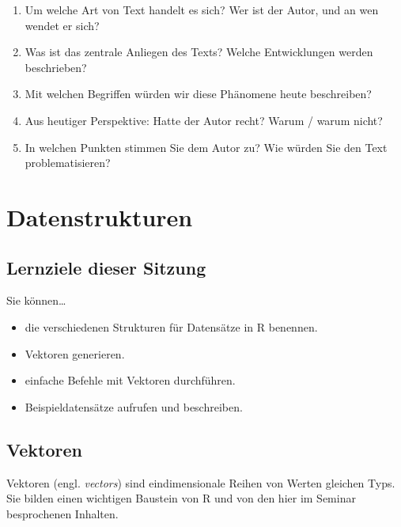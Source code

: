 \documentclass[11pt,german,a4paper]{article}
\providecommand{\tightlist}{%
  \setlength{\itemsep}{0pt}\setlength{\parskip}{0pt}}
\begin{document}
\begin{enumerate}
\def\labelenumi{\arabic{enumi}.}
\tightlist
\item
  Um welche Art von Text handelt es sich? Wer ist der Autor, und an wen wendet er sich?
\item
  Was ist das zentrale Anliegen des Texts? Welche Entwicklungen werden beschrieben?
\item
  Mit welchen Begriffen würden wir diese Phänomene heute beschreiben?
\item
  Aus heutiger Perspektive: Hatte der Autor recht? Warum / warum nicht?
\item
  In welchen Punkten stimmen Sie dem Autor zu? Wie würden Sie den Text problematisieren?
\end{enumerate}

\hypertarget{datenstrukturen}{%
\section{Datenstrukturen}\label{datenstrukturen}}

\hypertarget{lernziele-dieser-sitzung}{%
\subsection*{Lernziele dieser Sitzung}\label{lernziele-dieser-sitzung}}

Sie können\ldots{}

\begin{itemize}
\tightlist
\item
  die verschiedenen Strukturen für Datensätze in R benennen.
\item
  Vektoren generieren.
\item
  einfache Befehle mit Vektoren durchführen.
\item
  Beispieldatensätze aufrufen und beschreiben.
\end{itemize}

\hypertarget{vektoren}{%
\subsection*{Vektoren}\label{vektoren}}

Vektoren (engl. \emph{vectors}) sind eindimensionale Reihen von Werten gleichen Typs. Sie bilden einen wichtigen Baustein von R und von den hier im Seminar besprochenen Inhalten.
\end{document}
